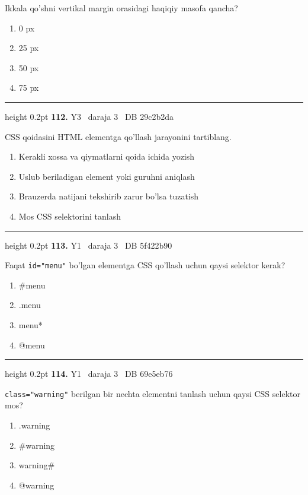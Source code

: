 \documentclass[10pt,a4paper,oneside]{article}
\begin{document}
\par
Ikkala qo'shni vertikal margin orasidagi haqiqiy masofa qancha?
\begin{enumerate}[label=\Alph*),leftmargin=9mm]
\item 0 px
\item 25 px
\item 50 px
\item 75 px
\end{enumerate}
\vspace{2mm}\hrule height 0.2pt \vspace{4mm}
\hypertarget{q112}{\textbf{\color{ink}112.}}  {\color{muted}\scriptsize Y3 \textbullet\ daraja 3 \textbullet\ DB 29c2b2da}
\par
CSS qoidasini HTML elementga qo'llash jarayonini tartiblang.
\begin{enumerate}[label=\Alph*),leftmargin=9mm]
\item Kerakli xossa va qiymatlarni qoida ichida yozish
\item Uslub beriladigan element yoki guruhni aniqlash
\item Brauzerda natijani tekshirib zarur bo'lsa tuzatish
\item Mos CSS selektorini tanlash
\end{enumerate}
\vspace{2mm}\hrule height 0.2pt \vspace{4mm}
\hypertarget{q113}{\textbf{\color{ink}113.}}  {\color{muted}\scriptsize Y1 \textbullet\ daraja 3 \textbullet\ DB 5f422b90}
\par
Faqat \texttt{id="menu"} bo'lgan elementga CSS qo'llash uchun qaysi selektor kerak?
\begin{enumerate}[label=\Alph*),leftmargin=9mm]
\item \#menu
\item .menu
\item menu*
\item @menu
\end{enumerate}
\vspace{2mm}\hrule height 0.2pt \vspace{4mm}
\hypertarget{q114}{\textbf{\color{ink}114.}}  {\color{muted}\scriptsize Y1 \textbullet\ daraja 3 \textbullet\ DB 69e5eb76}
\par
\texttt{class="warning"} berilgan bir nechta elementni tanlash uchun qaysi CSS selektor mos?
\begin{enumerate}[label=\Alph*),leftmargin=9mm]
\item .warning
\item \#warning
\item warning\#
\item @warning
\end{enumerate}
\end{document}
